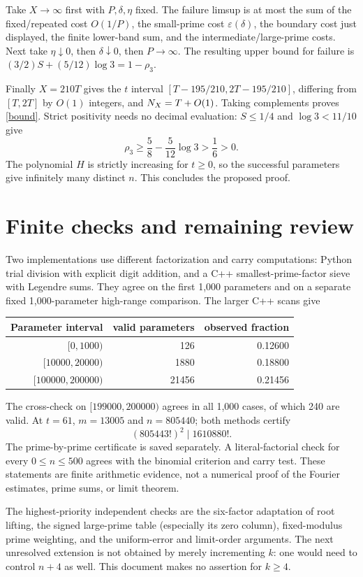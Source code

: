 \documentclass[11pt]{article}
\begin{document}
Take $X\to\infty$ first with $P,\delta,\eta$ fixed. The failure limsup is at
most the sum of the fixed/repeated cost $O(1/P)$, the small-prime cost
$\varepsilon(\delta)$, the boundary cost just displayed, the finite lower-band
sum, and the intermediate/large-prime costs. Next take $\eta\downarrow0$, then
$\delta\downarrow0$, then $P\to\infty$. The resulting upper bound for failure
is $(3/2)S+(5/12)\log3=1-\rho_3$.

Finally $X=210T$ gives the $t$ interval
$[T-195/210,2T-195/210]$, differing from $[T,2T]$ by $O(1)$ integers, and
$N_X=T+O(1)$. Taking complements proves \eqref{bound}. Strict positivity needs
no decimal evaluation: $S\le1/4$ and $\log3<11/10$ give
\[
 \rho_3\ge\frac58-\frac5{12}\log3>\frac16>0.
\]
The polynomial $H$ is strictly increasing for $t\ge0$, so the successful
parameters give infinitely many distinct $n$. This concludes the proposed proof.

\section{Finite checks and remaining review}\label{computations}
Two implementations use different factorization and carry computations:
Python trial division with explicit digit addition, and a C++ smallest-prime-factor
sieve with Legendre sums. They agree on the first 1,000 parameters and on a
separate fixed 1,000-parameter high-range comparison. The larger C++ scans give
\begin{center}
\begin{tabular}{rrr}
\toprule
Parameter interval & valid parameters & observed fraction\\
\midrule
$[0,1000)$ &126&0.12600\\
$[10000,20000)$ &1880&0.18800\\
$[100000,200000)$ &21456&0.21456\\
\bottomrule
\end{tabular}
\end{center}
The cross-check on $[199000,200000)$ agrees in all 1,000 cases, of which 240
are valid. At $t=61$, $m=13005$ and $n=805440$; both methods certify
\[
 (805443!)^2\mid1610880!.
\]
The prime-by-prime certificate is saved separately. A literal-factorial check
for every $0\le n\le500$ agrees with the binomial criterion and carry test.
These statements are finite arithmetic evidence, not a numerical proof of the
Fourier estimates, prime sums, or limit theorem.

The highest-priority independent checks are the six-factor adaptation of root
lifting, the signed large-prime table (especially its zero column), fixed-modulus
prime weighting, and the uniform-error and limit-order arguments. The next
unresolved extension is not obtained by merely incrementing $k$: one would need
to control $n+4$ as well. This document makes no assertion for $k\ge4$.
\end{document}
